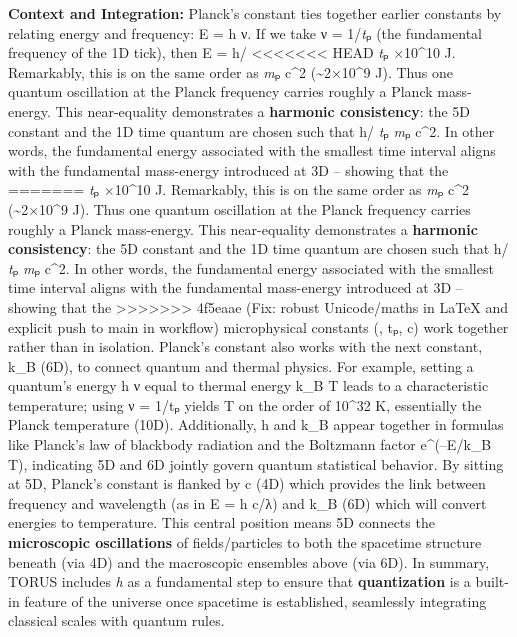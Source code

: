 \documentclass[]{article}
\begin{document}
\textbf{Context and Integration:} Planck's constant ties together
earlier constants by relating energy and frequency: E = h ν. If we take
ν = 1/\emph{t}ₚ (the fundamental frequency of the 1D tick), then E = h/
<<<<<<< HEAD
\emph{t}ₚ ×10\^{}10 J\hspace{0pt}. Remarkably, this is on the same
order as \emph{m}ₚ c\^{}2 (\textasciitilde2×10\^{}9 J)\hspace{0pt}. Thus
one quantum oscillation at the Planck frequency carries roughly a Planck
mass-energy. This near-equality demonstrates a \textbf{harmonic
consistency}: the 5D constant and the 1D time quantum are chosen such
that h/ \emph{t}ₚ \approx \emph{m}ₚ c\^{}2\hspace{0pt}. In other words, the
fundamental energy associated with the smallest time interval aligns
with the fundamental mass-energy introduced at 3D -- showing that the
=======
\emph{t}ₚ ×10\^{}10 J​. Remarkably, this is on the same order as
\emph{m}ₚ c\^{}2 (\textasciitilde{}2×10\^{}9 J)​. Thus one quantum
oscillation at the Planck frequency carries roughly a Planck
mass-energy. This near-equality demonstrates a \textbf{harmonic
consistency}: the 5D constant and the 1D time quantum are chosen such
that h/ \emph{t}ₚ \approx \emph{m}ₚ c\^{}2​. In other words, the fundamental
energy associated with the smallest time interval aligns with the
fundamental mass-energy introduced at 3D -- showing that the
>>>>>>> 4f5eaae (Fix: robust Unicode/maths in LaTeX and explicit push to main in workflow)
microphysical constants (\hbar, tₚ, c) work together rather than in
isolation. Planck's constant also works with the next constant, k\_B
(6D), to connect quantum and thermal physics. For example, setting a
quantum's energy h ν equal to thermal energy k\_B T leads to a
characteristic temperature; using ν = 1/tₚ yields T on the order of
10\^{}32 K, essentially the Planck temperature (10D)​. Additionally, h
and k\_B appear together in formulas like Planck's law of blackbody
radiation and the Boltzmann factor e\^{}(--E/k\_B T), indicating 5D and
6D jointly govern quantum statistical behavior. By sitting at 5D,
Planck's constant is flanked by c (4D) which provides the link between
frequency and wavelength (as in E = h c/λ) and k\_B (6D) which will
convert energies to temperature​. This central position means 5D
connects the \textbf{microscopic oscillations} of fields/particles to
both the spacetime structure beneath (via 4D) and the macroscopic
ensembles above (via 6D). In summary, TORUS includes \emph{h} as a
fundamental step to ensure that \textbf{quantization} is a built-in
feature of the universe once spacetime is established, seamlessly
integrating classical scales with quantum rules.
\end{document}
